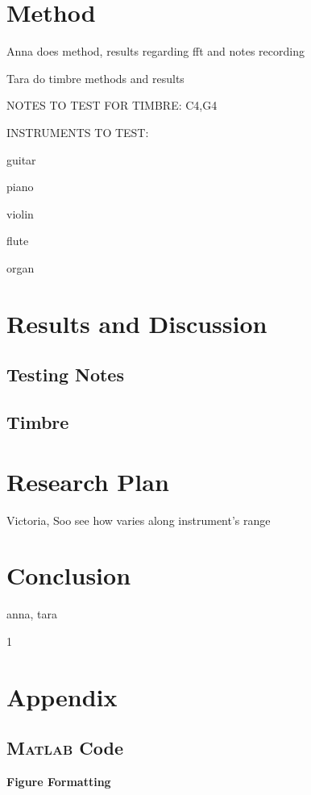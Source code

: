 \documentclass{article}
\begin{document}
\section{Method}
Anna does method, results regarding fft and notes recording

Tara do timbre methods and results

NOTES TO TEST FOR TIMBRE: C4,G4

INSTRUMENTS TO TEST:

guitar

piano

violin

flute

organ

\section{Results and Discussion}
\subsection{Testing Notes}
\subsection{Timbre}
\newpage


\section{Research Plan}
Victoria, Soo
see how varies along instrument's range
\section{Conclusion}
anna, tara

\newpage
{}
\setcounter{page}1



\newpage
\section{Appendix}
\subsection{\textsc{Matlab} Code}

\noindent\textbf{Figure Formatting}


\end{document}
